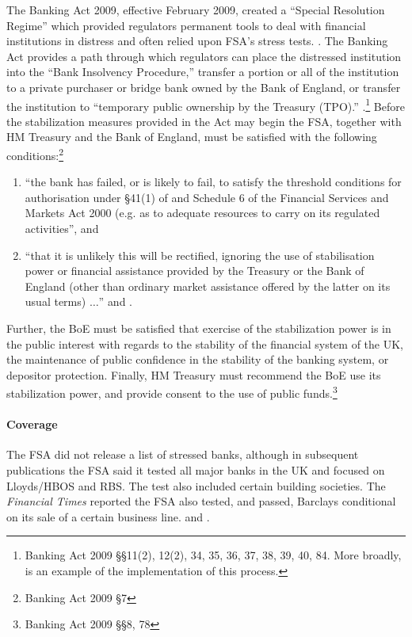 \documentclass[12pt]{article}
\begin{document}
The Banking Act 2009, effective February 2009, created a ``Special Resolution Regime'' which provided regulators permanent tools to deal with financial institutions in distress and often relied upon FSA's stress tests. \citep{BankingAct}. The Banking Act provides a path through which regulators can place the distressed institution into the ``Bank Insolvency Procedure,'' transfer a portion or all of the institution to a private purchaser or bridge bank owned by the Bank of England, or transfer the institution to ``temporary public ownership by the Treasury (TPO).'' \citep{ DunfermlinePress}.\footnote{Banking Act 2009 \S \S 11(2), 12(2), 34, 35, 36, 37, 38, 39, 40, 84. More broadly, \citet{Dunfermline} is an example of the implementation of this process. } Before the stabilization measures provided in the Act may begin the FSA, together with HM Treasury and the Bank of England,  must be satisfied with the following conditions:\footnote{Banking Act 2009 \S 7}

\begin{enumerate}
\item ``the bank has failed, or is likely to fail, to satisfy the threshold conditions for authorisation under \S 41(1) of and Schedule 6 of the Financial Services and Markets Act 2000 (e.g. as to adequate resources to carry on its regulated activities'', and
\item ``that it is unlikely this will be rectified, ignoring the use of stabilisation power or financial assistance provided by the Treasury or the Bank of England (other than ordinary market assistance offered by the latter on its usual terms) $\dots$'' \citep{BankingAct} and \citep{McKnight}.
\end{enumerate}

Further, the BoE must be satisfied that exercise of the stabilization power is in the public interest with regards to the stability of the financial system of the UK, the maintenance of public confidence in the stability of the banking system, or depositor protection. Finally, HM Treasury must recommend the BoE use its stabilization power, and provide consent to the use of public funds.\footnote{Banking Act 2009 \S \S 8, 78}

\paragraph{Coverage}

The FSA did not release a list of stressed banks, although in subsequent publications the FSA said it tested all major banks in the UK and focused on Lloyds/HBOS and RBS. The test also included certain building societies. The \textit{Financial Times} reported the FSA also tested, and passed, Barclays conditional on its sale of a certain business line. \citep{Results} and \citep{Barclays1}.
\end{document}
